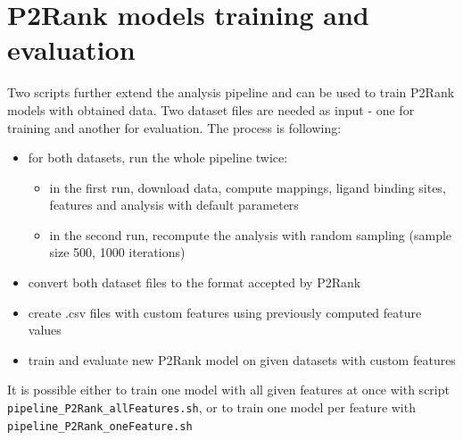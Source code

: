 \section{P2Rank models training and evaluation}

Two scripts further extend the analysis pipeline and can be used to train P2Rank models with obtained data. Two dataset files are needed as input - one for training and another for evaluation. The process is following:

\begin{itemize}
\item for both datasets, run the whole pipeline twice:
	\begin{itemize}
	\item in the first run, download data, compute mappings, ligand binding sites, features and analysis with default parameters
	\item in the second run, recompute the analysis with random sampling (sample size 500, 1000 iterations)
	\end{itemize}
\item convert both dataset files to the format accepted by P2Rank
\item create .csv files with custom features using previously computed feature values
\item train and evaluate new P2Rank model on given datasets with custom features
\end{itemize}

It is possible either to train one model with all given features at once with script \texttt{pipeline\_P2Rank\_allFeatures.sh}, or to train one model per feature with \texttt{pipeline\_P2Rank\_oneFeature.sh}


